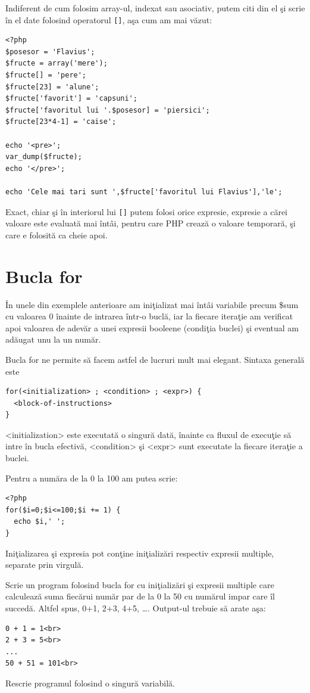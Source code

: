 Indiferent de cum folosim array-ul, indexat sau asociativ, putem citi din el şi
scrie în el date folosind operatorul \texttt{[]}, aşa cum am mai văzut:
\begin{lstlisting}
<?php
$posesor = 'Flavius';
$fructe = array('mere');
$fructe[] = 'pere';
$fructe[23] = 'alune';
$fructe['favorit'] = 'capsuni';
$fructe['favoritul lui '.$posesor] = 'piersici';
$fructe[23*4-1] = 'caise';

echo '<pre>';
var_dump($fructe);
echo '</pre>';

echo 'Cele mai tari sunt ',$fructe['favoritul lui Flavius'],'le';
\end{lstlisting}
Exact, chiar şi în interiorul lui \texttt{[]} putem folosi orice expresie,
expresie a cărei valoare este evaluată mai întâi, pentru care PHP
crează o valoare temporară, şi care e folosită ca cheie apoi.

\section{Bucla for}
În unele din exemplele anterioare am iniţializat mai întâi variabile
precum \$sum cu valoarea 0 înainte de intrarea într-o buclă,
iar la fiecare iteraţie am verificat apoi valoarea 
de adevăr a unei expresii booleene (condiţia buclei) şi eventual
am adăugat unu la un număr.

Bucla for ne permite să facem astfel de lucruri mult mai elegant.
Sintaxa generală este
\begin{verbatim}
for(<initialization> ; <condition> ; <expr>) {
  <block-of-instructions>
}
\end{verbatim}
<initialization> este executată o singură dată, înainte ca
fluxul de execuţie să intre în bucla efectivă,
<condition> şi <expr> sunt executate la fiecare iteraţie
a buclei.

Pentru a număra de la 0 la 100 am putea scrie:
\begin{lstlisting}
<?php
for($i=0;$i<=100;$i += 1) {
  echo $i,' ';
}
\end{lstlisting}

Iniţializarea şi expresia pot conţine iniţializări 
respectiv expresii multiple, separate prin virgulă.

\begin{Exercise}[title={Două câte două},difficulty=2]

\ExePart

Scrie un program folosind bucla for cu iniţializări şi expresii
multiple care calculează suma fiecărui număr par de la 0 la 50
cu numărul impar care îl succedă. Altfel spus, 0+1, 2+3,
4+5, \ldots. Output-ul trebuie să arate aşa:
\begin{verbatim}
0 + 1 = 1<br>
2 + 3 = 5<br>
...
50 + 51 = 101<br>
\end{verbatim}
\ExePart
Rescrie programul folosind o singură variabilă.
\end{Exercise}



